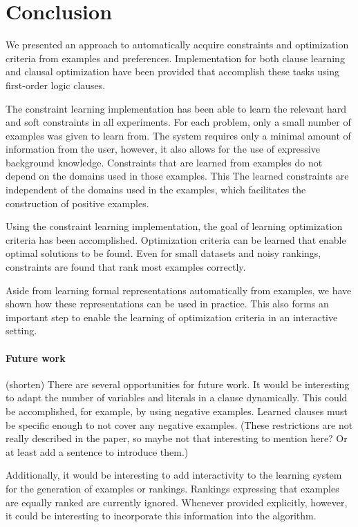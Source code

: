 \documentclass[letterpaper]{article}
\theoremstyle{definition}
\newcommand{\anton}[1]{{\color{green}(#1)}}
\newcommand{\sam}[1]{{\color{red}(#1)}}
\begin{document}

\section{Conclusion}
We presented an approach to automatically acquire constraints and optimization criteria from examples and preferences.
Implementation for both clause learning and clausal optimization have been provided that accomplish these tasks using first-order logic clauses.

The constraint learning implementation has been able to learn the relevant hard and soft constraints in all experiments.
For each problem, only a small number of examples was given to learn from.
The system requires only a minimal amount of information from the user, however, it also allows for the use of expressive background knowledge.
Constraints that are learned from examples do not depend on the domains used in those examples.
This 
The learned constraints are independent of the domains used in the examples, which facilitates the construction of positive examples.

Using the constraint learning implementation, the goal of learning optimization criteria has been accomplished.
Optimization criteria can be learned that enable optimal solutions to be found.
Even for small datasets and noisy rankings, constraints are found that rank most examples correctly.

Aside from learning formal representations automatically from examples, we have shown how these representations can be used in practice.
This also forms an important step to enable the learning of optimization criteria in an interactive setting.

\paragraph{Future work} \sam{shorten}
There are several opportunities for future work.
It would be interesting to adapt the number of variables and literals in a clause dynamically.
This could be accomplished, for example, by using negative examples.
Learned clauses must be specific enough to not cover any negative examples. 
\anton{These restrictions are not really described in the paper, so maybe not that interesting to mention here? Or at least add a sentence to introduce them.}

Additionally, it would be interesting to add interactivity to the learning system for the generation of examples or rankings.
Rankings expressing that examples are equally ranked are currently ignored.
Whenever provided explicitly, however, it could be interesting to incorporate this information into the algorithm.
\end{document}
